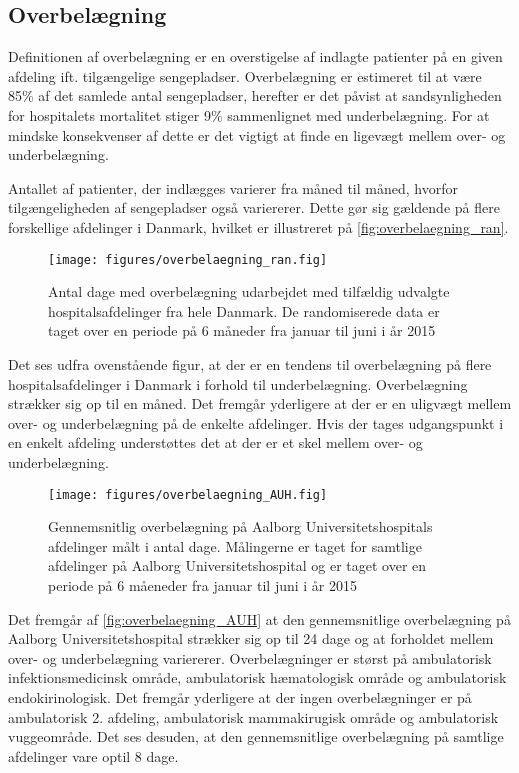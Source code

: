 \subsection{Overbelægning}
Definitionen af overbelægning er en overstigelse af indlagte patienter på en given afdeling ift. tilgængelige sengepladser. Overbelægning er estimeret til at være 85\% af det samlede antal sengepladser, herefter er det påvist at sandsynligheden for hospitalets mortalitet  stiger 9\% sammenlignet med underbelægning. \citep{dodlighed2014} For at mindske konsekvenser af dette er det vigtigt at finde en ligevægt mellem over- og underbelægning.  

Antallet af patienter, der indlægges varierer fra måned til måned, hvorfor tilgængeligheden af sengepladser også variererer. Dette gør sig gældende på flere forskellige afdelinger i Danmark, hvilket er illustreret på \autoref{fig:overbelaegning_ran}.

\begin{figure}[H]
\centering
\texttt{[image: figures/overbelaegning\_ran.fig]}
\caption{Antal dage med overbelægning udarbejdet med tilfældig udvalgte hospitalsafdelinger fra hele Danmark. De randomiserede data er taget over en periode på 6 måneder fra januar til juni i år 2015}
\label{fig:overbelaegning_ran}
\end{figure}

\noindent
Det ses udfra ovenstående figur, at der er en tendens til overbelægning på flere hospitalsafdelinger i Danmark i forhold til underbelægning. Overbelægning strækker sig op til en måned. Det fremgår yderligere at der er en uligvægt mellem over- og underbelægning på de enkelte afdelinger. Hvis der tages udgangspunkt i en enkelt afdeling understøttes det at der er et skel mellem over- og underbelægning.    

\begin{figure}[H]
\centering
\texttt{[image: figures/overbelaegning\_AUH.fig]}
\caption{Gennemsnitlig overbelægning på Aalborg Universitetshospitals afdelinger målt i antal dage. Målingerne er taget for samtlige afdelinger på Aalborg Universitetshospital og er taget over en periode på 6 måeneder fra januar til juni i år 2015}
\label{fig:overbelaegning_AUH}
\end{figure}

\noindent
Det fremgår af \autoref{fig:overbelaegning_AUH} at den gennemsnitlige overbelægning på Aalborg Universitetshospital strækker sig op til 24 dage og at forholdet mellem over- og underbelægning variererer. Overbelægninger er størst på ambulatorisk infektionsmedicinsk område, ambulatorisk hæmatologisk område og ambulatorisk endokirinologisk. Det fremgår yderligere at der ingen overbelægninger er på ambulatorisk 2. afdeling, ambulatorisk mammakirugisk  område og ambulatorisk vuggeområde. Det ses desuden, at den gennemsnitlige overbelægning på samtlige afdelinger vare optil 8 dage.  






